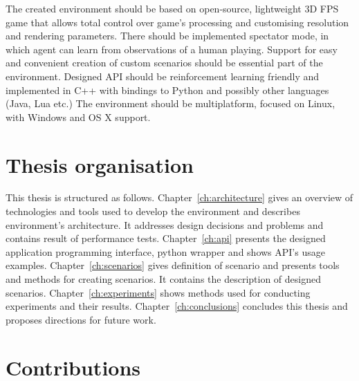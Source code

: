 The created environment should be based on open-source, lightweight 3D FPS game that allows total control over game's processing and customising resolution and rendering parameters.
There should be implemented spectator mode, in which agent can learn from observations of a human playing.
Support for easy and convenient creation of custom scenarios should be essential part of the environment. 
Designed API should be reinforcement learning friendly and implemented in C++ with bindings to Python and possibly other languages (Java, Lua etc.)
The environment should be multiplatform, focused on Linux, with Windows and OS X support.

	
\section{Thesis organisation}


This thesis is structured as follows. 
Chapter~\ref{ch:architecture} gives an overview of technologies and tools used to develop the environment and describes environment's architecture. It addresses design decisions and problems and contains result of performance tests. 
Chapter~\ref{ch:api} presents the designed application programming interface, python wrapper and shows API's usage examples. 
Chapter~\ref{ch:scenarios} gives definition of scenario and presents tools and methods for creating scenarios. It contains the description of designed scenarios. 
Chapter~\ref{ch:experiments} shows methods used for conducting experiments and their results. 
Chapter~\ref{ch:conclusions} concludes this thesis and proposes directions for future work.

\section{Contributions}
